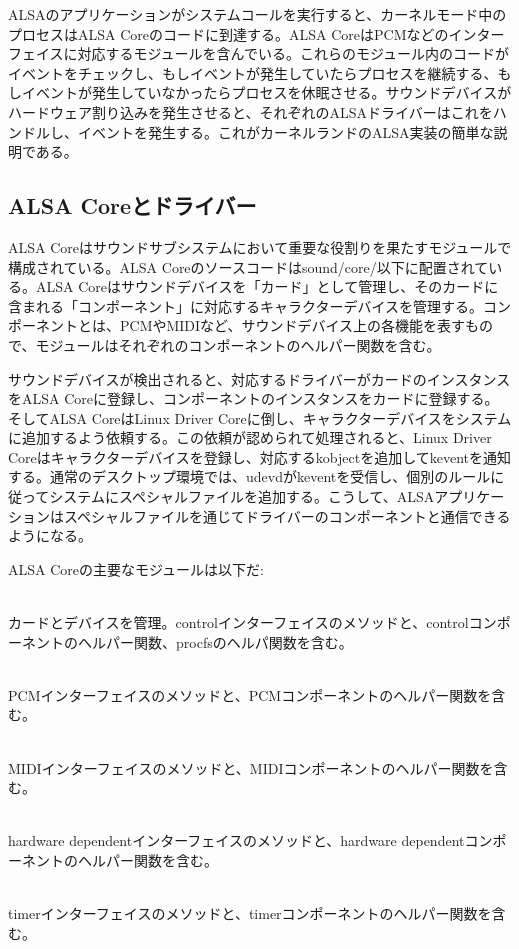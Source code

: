 \documentclass[onecolumn]{jarticle}
\begin{document}
ALSAのアプリケーションがシステムコールを実行すると、カーネルモード中のプロセスはALSA Coreのコードに到達する。ALSA CoreはPCMなどのインターフェイスに対応するモジュールを含んでいる。これらのモジュール内のコードがイベントをチェックし、もしイベントが発生していたらプロセスを継続する、もしイベントが発生していなかったらプロセスを休眠させる。サウンドデバイスがハードウェア割り込みを発生させると、それぞれのALSAドライバーはこれをハンドルし、イベントを発生する。これがカーネルランドのALSA実装の簡単な説明である。

\subsection{ALSA Coreとドライバー}

ALSA Coreはサウンドサブシステムにおいて重要な役割りを果たすモジュールで構成されている。ALSA Coreのソースコードはsound/core/以下に配置されている。ALSA Coreはサウンドデバイスを「カード」として管理し、そのカードに含まれる「コンポーネント」に対応するキャラクターデバイスを管理する\cite{alsa-driver}。コンポーネントとは、PCMやMIDIなど、サウンドデバイス上の各機能を表すもので、モジュールはそれぞれのコンポーネントのヘルパー関数を含む。

サウンドデバイスが検出されると、対応するドライバーがカードのインスタンスをALSA Coreに登録し、コンポーネントのインスタンスをカードに登録する。そしてALSA CoreはLinux Driver Coreに倒し、キャラクターデバイスをシステムに追加するよう依頼する。この依頼が認められて処理されると、Linux Driver Coreはキャラクターデバイスを登録し、対応するkobjectを追加してkeventを通知する。通常のデスクトップ環境では、udevdがkeventを受信し、個別のルールに従ってシステムにスペシャルファイルを追加する。こうして、ALSAアプリケーションはスペシャルファイルを通じてドライバーのコンポーネントと通信できるようになる。

ALSA Coreの主要なモジュールは以下だ:

\begin{description}
\small
\item[snd] \mbox{} \\
カードとデバイスを管理。controlインターフェイスのメソッドと、controlコンポーネントのヘルパー関数、procfsのヘルパ関数を含む。
\item[snd\_pcm] \mbox{} \\
PCMインターフェイスのメソッドと、PCMコンポーネントのヘルパー関数を含む。
\item[snd\_rawmidi] \mbox{} \\
MIDIインターフェイスのメソッドと、MIDIコンポーネントのヘルパー関数を含む。
\item[snd\_hwdep] \mbox{} \\
hardware dependentインターフェイスのメソッドと、hardware dependentコンポーネントのヘルパー関数を含む。
\item[snd\_timer] \mbox{} \\
timerインターフェイスのメソッドと、timerコンポーネントのヘルパー関数を含む。
\end{description}
\end{document}
